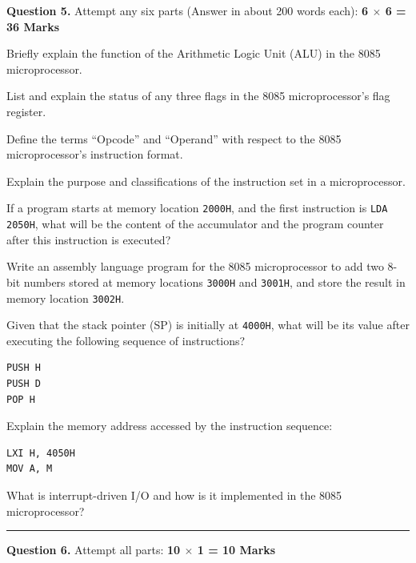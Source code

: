 \documentclass[11pt,a4paper]{article}
\begin{document}
\noindent   \textbf{Question 5.} Attempt any six parts (Answer in about 200 words each): \hfill   \textbf{6 $ \times$ 6 = 36 Marks}

\begin{parts}
  \item Briefly explain the function of the Arithmetic Logic Unit (ALU) in the 8085 microprocessor.
  \item List and explain the status of any three flags in the 8085 microprocessor's flag register.
  \item Define the terms ``Opcode'' and ``Operand'' with respect to the 8085 microprocessor's instruction format.
  \item Explain the purpose and classifications of the instruction set in a microprocessor.
  \item If a program starts at memory location   \texttt{2000H}, and the first instruction is   \texttt{LDA 2050H}, what will be the content of the accumulator and the program counter after this instruction is executed?
  \item Write an assembly language program for the 8085 microprocessor to add two 8-bit numbers stored at memory locations   \texttt{3000H} and   \texttt{3001H}, and store the result in memory location   \texttt{3002H}.
  \item Given that the stack pointer (SP) is initially at   \texttt{4000H}, what will be its value after executing the following sequence of instructions?
  
\begin{lstlisting}[language={[x86masm]Assembler}]
PUSH H
PUSH D
POP H
  \end{lstlisting}
  \item Explain the memory address accessed by the instruction sequence:
  
\begin{lstlisting}[language={[x86masm]Assembler}]
LXI H, 4050H
MOV A, M
  \end{lstlisting}
  \item What is interrupt-driven I/O and how is it implemented in the 8085 microprocessor?
\end{parts}

\bigskip


\rule{\linewidth}{0.4pt}\smallskip




\noindent   \textbf{Question 6.} Attempt all parts: \hfill   \textbf{10 $ \times$ 1 = 10 Marks}
\end{document}
